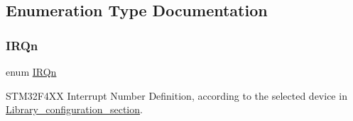 \subsection{Enumeration Type Documentation}
\mbox{\label{group___configuration__section__for___c_m_s_i_s_ga666eb0caeb12ec0e281415592ae89083}} 
\subsubsection{\texorpdfstring{I\+R\+Qn}{IRQn}}
{\footnotesize\ttfamily enum \hyperlink{group___configuration__section__for___c_m_s_i_s_ga666eb0caeb12ec0e281415592ae89083}{I\+R\+Qn}}



S\+T\+M32\+F4\+XX Interrupt Number Definition, according to the selected device in \hyperlink{group___library__configuration__section}{Library\+\_\+configuration\+\_\+section}. 

